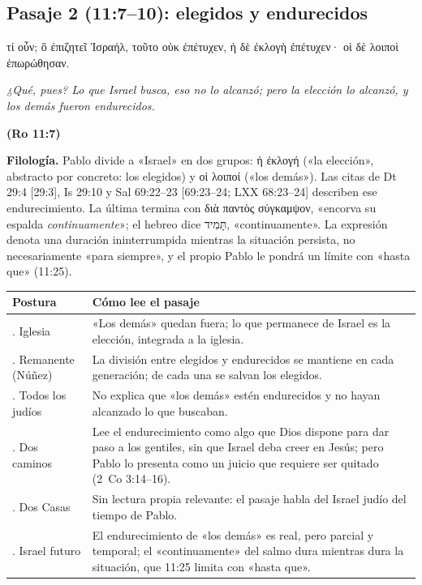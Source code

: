 \documentclass[11pt,letterpaper]{article}
\newcommand{\heb}[1]{\mbox{\foreignlanguage{hebrew}{#1}}}
\newcommand{\grc}[1]{\foreignlanguage{ancientgreek}{#1}}
\newcommand{\fuente}[1]{\par\hfill{\upshape\bfseries\small\textcolor{ladrillo}{#1}}}
\begin{document}
\subsection{Pasaje 2 (11:7--10): elegidos y endurecidos}

\begin{cita}[fontupper=\upshape]
\grc{τί οὖν; ὃ ἐπιζητεῖ Ἰσραήλ, τοῦτο οὐκ ἐπέτυχεν, ἡ δὲ ἐκλογὴ ἐπέτυχεν· οἱ δὲ λοιποὶ ἐπωρώθησαν.}\par\smallskip
\itshape ¿Qué, pues? Lo que Israel busca, eso no lo alcanzó; pero la elección lo alcanzó, y los demás fueron endurecidos.\fuente{(Ro 11:7)}
\end{cita}

\textbf{Filología.} Pablo divide a «Israel» en dos grupos: \grc{ἡ ἐκλογή} («la elección», abstracto por concreto: los elegidos) y \grc{οἱ λοιποί} («los demás»). Las citas de Dt 29:4 [29:3], Is 29:10 y Sal 69:22--23 [69:23--24; LXX 68:23--24] describen ese endurecimiento. La última termina con \grc{διὰ παντὸς σύγκαμψον}, «encorva su espalda \emph{continuamente}»; el hebreo dice \heb{תָּמִיד}, «continuamente». La expresión denota una duración ininterrumpida mientras la situación persista, no necesariamente «para siempre», y el propio Pablo le pondrá un límite con «hasta que» (11:25).

\begin{center}\footnotesize
\renewcommand{\arraystretch}{1.25}
\begin{tabular}{>{\RaggedRight\arraybackslash}p{2.9cm}>{\RaggedRight\arraybackslash}p{11.1cm}}
\toprule
\textbf{Postura} & \textbf{Cómo lee el pasaje}\\
\midrule
1. Iglesia & «Los demás» quedan fuera; lo que permanece de Israel es la elección, integrada a la iglesia.\\
2. Remanente (Núñez) & La división entre elegidos y endurecidos se mantiene en cada generación; de cada una se salvan los elegidos.\\
3. Todos los judíos & No explica que «los demás» estén endurecidos y no hayan alcanzado lo que buscaban.\\
4. Dos caminos & Lee el endurecimiento como algo que Dios dispone para dar paso a los gentiles, sin que Israel deba creer en Jesús; pero Pablo lo presenta como un juicio que requiere ser quitado (2~Co 3:14--16).\\
5. Dos Casas & Sin lectura propia relevante: el pasaje habla del Israel judío del tiempo de Pablo.\\
6. Israel futuro & El endurecimiento de «los demás» es real, pero parcial y temporal; el «continuamente» del salmo dura mientras dura la situación, que 11:25 limita con «hasta que».\\
\bottomrule
\end{tabular}\end{center}
\end{document}
